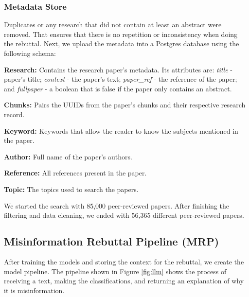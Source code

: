 \subsubsection{Metadata Store}
Duplicates or any research that did not contain at least an abstract were removed. That ensures that there is no repetition or inconsistency when doing the rebuttal. Next, we upload the metadata into a Postgres database using the following schema:
\begin{description}
	\item{\textbf{Research:}}  Contains the research paper's metadata. Its attributes are: \textit{title} - paper's title; \textit{context} - the paper’s text; \textit{paper\_ref} - the reference of the paper; and \textit{fullpaper} - a boolean that is false if the paper only contains an abstract.
	\item{\textbf{Chunks:}} Pairs the UUIDs from the paper's chunks and their respective research record.  
	\item{\textbf{Keyword:}} Keywords that allow the reader to know the subjects mentioned in the paper. 
	\item{\textbf{Author:}} Full name of the paper's authors. 
	\item{\textbf{Reference:}} All references present in the paper.
	\item{\textbf{Topic:}} The topics used to search the papers.

\end{description}



We started the search with 85,000 peer-reviewed papers. After finishing the filtering and data cleaning, we ended with 56,365 different peer-reviewed papers. 


\subsection{Misinformation Rebuttal Pipeline (MRP)}
After training the models and storing the context for the rebuttal, we create the model pipeline. The pipeline shown in Figure \ref{fig:llm} shows the process of receiving a text, making the classifications, and returning an explanation of why it is misinformation.

